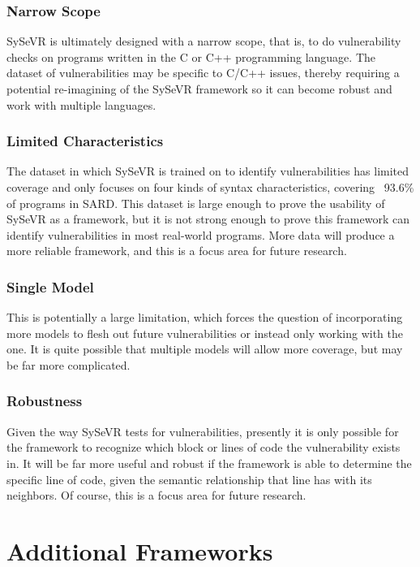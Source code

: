 \documentclass[12pt,twocolumn,letterpaper]{article}
\begin{document}
\subsubsection{Narrow Scope}
SySeVR is ultimately designed with a narrow scope, that is, to do vulnerability checks on programs written in
the C or C++ programming language. The dataset of vulnerabilities may be specific to C/C++ issues, thereby requiring
a potential re-imagining of the SySeVR framework so it can become robust and work with multiple languages.
\subsubsection{Limited Characteristics}
The dataset in which SySeVR is trained on to identify vulnerabilities has limited coverage and only focuses on four
kinds of syntax characteristics, covering ~93.6\% of programs in SARD. This dataset is large enough to prove the usability
of SySeVR as a framework, but it is not strong enough to prove this framework can identify vulnerabilities in most real-world
programs. More data will produce a more reliable framework, and this is a focus area for future research.
\subsubsection{Single Model}
This is potentially a large limitation, which forces the question of incorporating more models to flesh out future
vulnerabilities or instead only working with the one. It is quite possible that multiple models will allow more coverage, but
may be far more complicated.
\subsubsection{Robustness}
Given the way SySeVR tests for vulnerabilities, presently it is only possible for the framework to recognize which
block or lines of code the vulnerability exists in. It will be far more useful and robust if the framework is able to
determine the specific line of code, given the semantic relationship that line has with its neighbors. Of course, this is
a focus area for future research.

\section{Additional Frameworks}
\label{sec:additional-frameworks}
\end{document}
